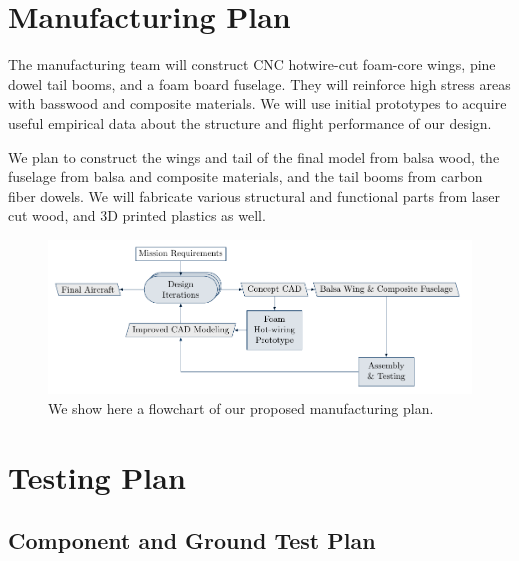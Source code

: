 \documentclass[proposal]{byu-aero}
\begin{document}
\section{Manufacturing Plan}
\label{sec:manufacturing}

The manufacturing team will construct CNC hotwire-cut foam-core wings, pine dowel tail booms, and a foam board fuselage. They will reinforce high stress areas with basswood and composite materials. We will use initial prototypes to acquire useful empirical data about the structure and flight performance of our design.

We plan to construct the wings and tail of the final model from balsa wood, the fuselage from balsa and composite materials, and the tail booms from carbon fiber dowels. We will fabricate various structural and functional parts from laser cut wood, and 3D printed plastics as well.

\begin{figure}[h!]
	\centering
	\includegraphics[width=4.5in]{manufacturing_flow.pdf}
	\caption{We show here a flowchart of our proposed manufacturing plan.}
	\label{fig:manufacturingplan}
\end{figure}

\vspace*{-1em}
 \section{Testing Plan}
 \label{sec:TestingPlan}

\subsection{Component and Ground Test Plan}
\end{document}
